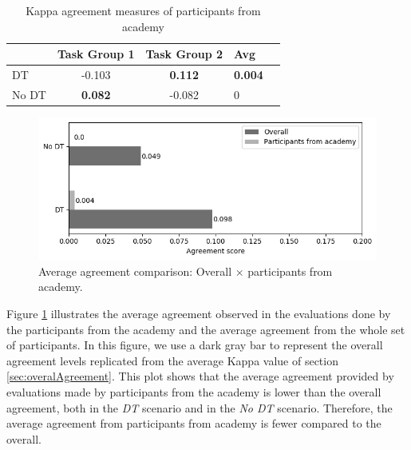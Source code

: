 \begin{table}[ht]
\centering
\setlength{\extrarowheight}{0pt}
\addtolength{\extrarowheight}{\aboverulesep}
\addtolength{\extrarowheight}{\belowrulesep}
\setlength{\aboverulesep}{0pt}
\setlength{\belowrulesep}{0pt}
\begin{tabular}{lcclc} 
\toprule
 & \multicolumn{1}{l}{Task Group 1} & \multicolumn{1}{l}{Task Group 2} & {\cellcolor[rgb]{0.753,0.753,0.753}}Avg \\ 
\midrule
DT & -0.103 & \textbf{0.112} & {\cellcolor[rgb]{0.753,0.753,0.753}}\textbf{0.004} \\
No DT & \textbf{0.082} & -0.082 & {\cellcolor[rgb]{0.753,0.753,0.753}}0 \\
\bottomrule
\end{tabular}
\caption{Kappa agreement measures of participants from academy}
\label{tbl:academyKappaValues}
\end{table}

\begin{figure}[ht]
\centering
\includegraphics[width=15cm]{figures/overallXacademy.png}
\caption{Average  agreement  comparison: Overall $\times$ participants from academy.}
\label{fig:overallXacademy}
\end{figure}

Figure \ref{fig:overallXacademy} illustrates the average agreement observed in the evaluations done by the participants from the academy and the average agreement from the whole set of participants. In this figure, we use a dark gray bar to represent the overall agreement levels replicated from the average Kappa value of section \ref{sec:overalAgreement}. This plot shows that the average agreement provided by evaluations made by participants from the academy is lower than the overall agreement, both in the \textit{DT} scenario and in the \textit{No DT} scenario. Therefore, the average agreement from participants from academy is fewer compared to the overall.


